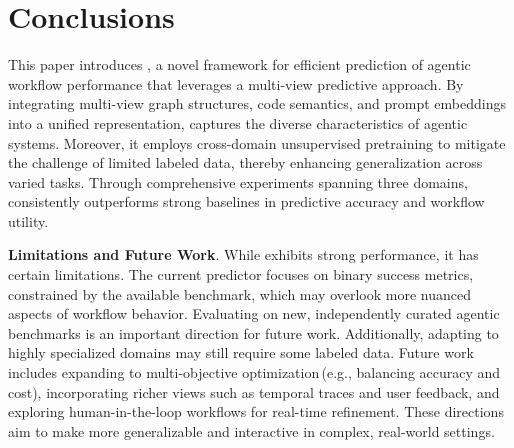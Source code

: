 
\vspace{-0.2cm}
\section{Conclusions} \label{section:conclusions}
\vspace{-0.2cm}
This paper introduces \ours{}, a novel framework for efficient prediction of agentic workflow performance that leverages a multi-view predictive approach. By integrating multi-view graph structures, code semantics, and prompt embeddings into a unified representation, \ours{} captures the diverse characteristics of agentic systems. Moreover, it employs cross-domain unsupervised pretraining to mitigate the challenge of limited labeled data, thereby enhancing generalization across varied tasks. Through comprehensive experiments spanning three domains, \ours{} consistently outperforms strong baselines in predictive accuracy and workflow utility.

\textbf{Limitations and Future Work}. While \ours{} exhibits strong performance, it has certain limitations. The current predictor focuses on binary success metrics, constrained by the available benchmark, which may overlook more nuanced aspects of workflow behavior. Evaluating on new, independently curated agentic benchmarks is an important direction for future work. Additionally, adapting to highly specialized domains may still require some labeled data. Future work includes expanding to multi-objective optimization\,(e.g., balancing accuracy and cost), incorporating richer views such as temporal traces and user feedback, and exploring human-in-the-loop workflows for real-time refinement. These directions aim to make \ours{} more generalizable and interactive in complex, real-world settings.

